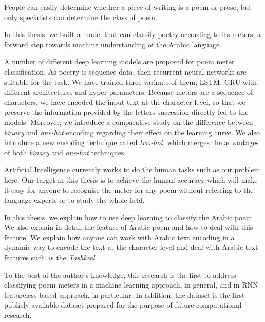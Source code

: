 
\begin{spacing}{1}\end{spacing}

People can easily determine whether a piece of writing is a poem or prose, but only specialists can determine the class of poem.

In this thesis, we built a model that can classify poetry according to its meters; a forward step towards machine understanding of the Arabic language.

A number of different deep learning models are proposed for poem meter classification. As poetry is sequence data, then recurrent neural networks are suitable for the task. We have trained three variants of them; LSTM, GRU with different architectures and hyper-parameters. Because meters are a sequence of characters, we have encoded the input text at the character-level, so that we preserve the information provided by the letters succession directly fed to the models. Moreover, we introduce a comparative study on the difference between \textit{binary} and \textit{one-hot} encoding regarding their effect on the learning curve. We also introduce a new encoding technique called \textit{two-hot}, which merges the advantages of both \textit{binary} and \textit{one-hot} techniques.


Artificial Intelligence currently works to do the human tasks such as our problem here. Our target in this thesis is to achieve the human accuracy which will make it easy for anyone to recognise the meter for any poem without referring to the language experts or to study the whole field.

In this thesis, we explain how to use deep learning to classify the Arabic poem. We also explain in detail the feature of Arabic poem and how to deal with this feature. We explain how anyone can work with Arabic text encoding in a dynamic way to encode the text at the character level and deal with Arabic text features such as the \textit{Tashkeel}.

To the best of the author’s knowledge, this research is the first to address classifying poem meters in a machine learning approach, in general, and in RNN featureless based approach, in particular. In addition, the dataset is the first publicly available dataset prepared for the purpose of future computational research.



